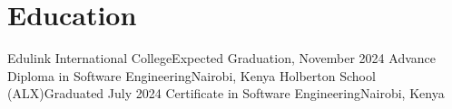 \section{Education}
    \resumeSubHeadingListStart

    \resumeSubheading
    {Edulink International College}{Expected Graduation, November 2024}
    {Advance Diploma in Software Engineering}{Nairobi, Kenya}
    \resumeItemListStart
    \resumeItemListEnd
    \resumeSubheading
    {Holberton School (ALX)}{Graduated July 2024}
    {Certificate in Software Engineering}{Nairobi, Kenya}
    \resumeItemListStart
    \resumeItemListEnd

    \resumeSubHeadingListEnd
